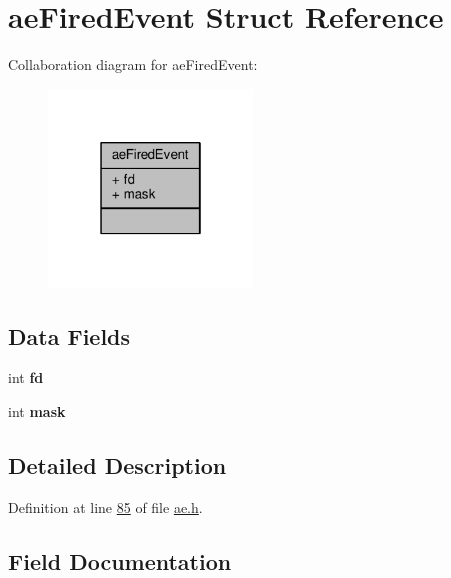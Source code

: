 \hypertarget{structaeFiredEvent}{}\section{ae\+Fired\+Event Struct Reference}
\label{structaeFiredEvent}


Collaboration diagram for ae\+Fired\+Event\+:\nopagebreak
\begin{figure}[H]
\begin{center}
\leavevmode
\includegraphics[width=154pt]{structaeFiredEvent__coll__graph}
\end{center}
\end{figure}
\subsection*{Data Fields}
\begin{DoxyCompactItemize}
\item 
\mbox{\label{structaeFiredEvent_a66b9859d9d3004b412954713c6e213c6}} 
int {\bfseries fd}
\item 
\mbox{\label{structaeFiredEvent_a2e9b1d9832d09a46c4a14e562aaa2aea}} 
int {\bfseries mask}
\end{DoxyCompactItemize}


\subsection{Detailed Description}


Definition at line \hyperlink{ae_8h_source_l00085}{85} of file \hyperlink{ae_8h_source}{ae.\+h}.



\subsection{Field Documentation}
\mbox{\label{structaeFiredEvent_a66b9859d9d3004b412954713c6e213c6}} 
